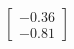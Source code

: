 \documentclass[preview]{standalone}
\begin{document}
\begin{align*}
\begin{bmatrix} -0.36 \\ -0.81 \end{bmatrix}
\end{align*}
\end{document}
